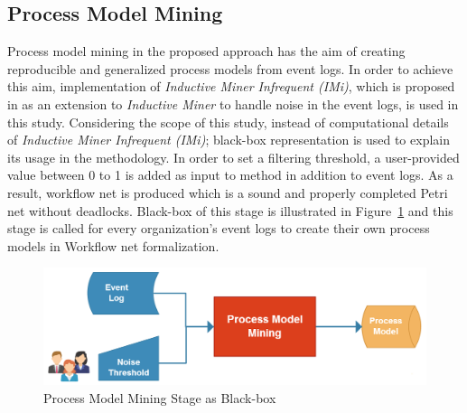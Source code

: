\subsection{Process Model Mining}
\label{subsec:process-model-mining}
Process model mining in the proposed approach has the aim of creating reproducible and generalized process models from event logs. In order to achieve this aim, implementation of \textit{Inductive Miner Infrequent (IMi)}, which is proposed in \cite{leemans2014discoveringinfrequent} as an extension to \textit{Inductive Miner} to handle noise in the event logs, is used in this study. Considering the scope of this study, instead of computational details of \textit{Inductive Miner Infrequent (IMi)}; black-box representation is used to explain its usage in the methodology. In order to set a filtering threshold, a user-provided value between 0 to 1 is added as input to method in addition to event logs. As a result, workflow net is produced which is a sound and properly completed Petri net without deadlocks. Black-box of this stage is illustrated in Figure~\ref{fig:process-model-mining-blackbox} and this stage is called for every organization's event logs to create their own process models in Workflow net formalization.

\begin{figure}
  \centering
  \includegraphics[width=\textwidth]{4_methodology/process-model-mining-blackbox}
  \caption{Process Model Mining Stage as Black-box }
  \label{fig:process-model-mining-blackbox}
\end{figure}

